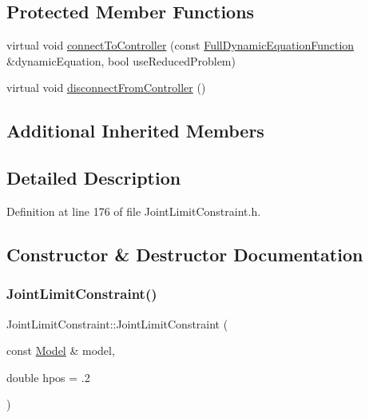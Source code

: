 \subsection*{Protected Member Functions}
\begin{DoxyCompactItemize}
\item 
virtual void \hyperlink{classocra_1_1JointLimitConstraint_a71cfd04e493f270e44b79fb5a46c1601}{connect\+To\+Controller} (const \hyperlink{classocra_1_1FullDynamicEquationFunction}{Full\+Dynamic\+Equation\+Function} \&dynamic\+Equation, bool use\+Reduced\+Problem)
\item 
virtual void \hyperlink{classocra_1_1JointLimitConstraint_a5f91d3b746f76f17f71a03b68de1f8ee}{disconnect\+From\+Controller} ()
\end{DoxyCompactItemize}
\subsection*{Additional Inherited Members}


\subsection{Detailed Description}


Definition at line 176 of file Joint\+Limit\+Constraint.\+h.



\subsection{Constructor \& Destructor Documentation}
\hypertarget{classocra_1_1JointLimitConstraint_af81ce81f8c90e5bf4272cc6ab592ae69}{}\label{classocra_1_1JointLimitConstraint_af81ce81f8c90e5bf4272cc6ab592ae69} 
\subsubsection{\texorpdfstring{Joint\+Limit\+Constraint()}{JointLimitConstraint()}\hspace{0.1cm}{\footnotesize\ttfamily [1/2]}}
{\footnotesize\ttfamily Joint\+Limit\+Constraint\+::\+Joint\+Limit\+Constraint (\begin{DoxyParamCaption}\item[{const \hyperlink{classocra_1_1Model}{Model} \&}]{model,  }\item[{double}]{hpos = {\ttfamily .2} }\end{DoxyParamCaption})}



